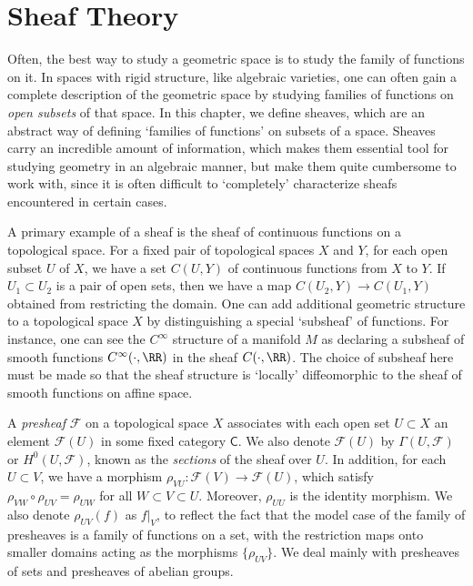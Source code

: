 \chapter{Sheaf Theory}

Often, the best way to study a geometric space is to study the family of functions on it. In spaces with rigid structure, like algebraic varieties, one can often gain a complete description of the geometric space by studying families of functions on \emph{open subsets} of that space. In this chapter, we define sheaves, which are an abstract way of defining `families of functions' on subsets of a space. Sheaves carry an incredible amount of information, which makes them essential tool for studying geometry in an algebraic manner, but make them quite cumbersome to work with, since it is often difficult to `completely' characterize sheafs encountered in certain cases.

A primary example of a sheaf is the sheaf of continuous functions on a topological space. For a fixed pair of topological spaces $X$ and $Y$, for each open subset $U$ of $X$, we have a set $C(U,Y)$ of continuous functions from $X$ to $Y$. If $U_1 \subset U_2$ is a pair of open sets, then we have a map $C(U_2,Y) \to C(U_1,Y)$ obtained from restricting the domain. One can add additional geometric structure to a topological space $X$ by distinguishing a special `subsheaf' of functions. For instance, one can see the $C^\infty$ structure of a manifold $M$ as declaring a subsheaf of smooth functions $C^\infty(\cdot,\RR)$ in the sheaf $C(\cdot, \RR)$. The choice of subsheaf here must be made so that the sheaf structure is `locally' diffeomorphic to the sheaf of smooth functions on affine space.

A \emph{presheaf} $\mathcal{F}$ on a topological space $X$ associates with each open set $U \subset X$ an element $\mathcal{F}(U)$ in some fixed category $\mathsf{C}$. We also denote $\mathcal{F}(U)$ by $\Gamma(U,\mathcal{F})$ or $H^0(U,\mathcal{F})$, known as the {\it sections} of the sheaf over $U$. In addition, for each $U \subset V$, we have a morphism $\rho_{VU}: \mathcal{F}(V) \to \mathcal{F}(U)$, which satisfy $\rho_{VW} \circ \rho_{UV} = \rho_{UW}$ for all $W \subset V \subset U$. Moreover, $\rho_{UU}$ is the identity morphism. We also denote $\rho_{UV}(f)$ as $f|_V$, to reflect the fact that the model case of the family of presheaves is a family of functions on a set, with the restriction maps onto smaller domains acting as the morphisms $\{ \rho_{UV} \}$. We deal mainly with presheaves of sets and presheaves of abelian groups.

